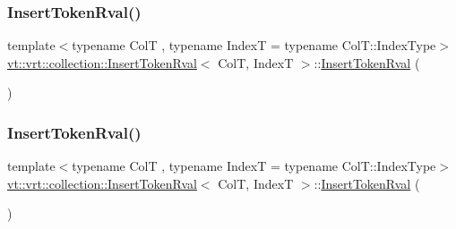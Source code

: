 \mbox{\label{structvt_1_1vrt_1_1collection_1_1_insert_token_rval_aea48b21e03ac5cab59b9e470af56f8c6}} 
\subsubsection{\texorpdfstring{Insert\+Token\+Rval()}{InsertTokenRval()}\hspace{0.1cm}{\footnotesize\ttfamily [2/3]}}
{\footnotesize\ttfamily template$<$typename ColT , typename IndexT  = typename Col\+T\+::\+Index\+Type$>$ \\
\hyperlink{structvt_1_1vrt_1_1collection_1_1_insert_token_rval}{vt\+::vrt\+::collection\+::\+Insert\+Token\+Rval}$<$ ColT, IndexT $>$\+::\hyperlink{structvt_1_1vrt_1_1collection_1_1_insert_token_rval}{Insert\+Token\+Rval} (\begin{DoxyParamCaption}\item[{\hyperlink{structvt_1_1vrt_1_1collection_1_1_insert_token_rval}{Insert\+Token\+Rval}$<$ ColT, IndexT $>$ const \&}]{ }\end{DoxyParamCaption})\hspace{0.3cm}{\ttfamily [delete]}}

\mbox{\label{structvt_1_1vrt_1_1collection_1_1_insert_token_rval_ad7bd979f47256df2d3357e2232ca23c2}} 
\subsubsection{\texorpdfstring{Insert\+Token\+Rval()}{InsertTokenRval()}\hspace{0.1cm}{\footnotesize\ttfamily [3/3]}}
{\footnotesize\ttfamily template$<$typename ColT , typename IndexT  = typename Col\+T\+::\+Index\+Type$>$ \\
\hyperlink{structvt_1_1vrt_1_1collection_1_1_insert_token_rval}{vt\+::vrt\+::collection\+::\+Insert\+Token\+Rval}$<$ ColT, IndexT $>$\+::\hyperlink{structvt_1_1vrt_1_1collection_1_1_insert_token_rval}{Insert\+Token\+Rval} (\begin{DoxyParamCaption}\item[{\hyperlink{structvt_1_1vrt_1_1collection_1_1_insert_token_rval}{Insert\+Token\+Rval}$<$ ColT, IndexT $>$ \&\&}]{ }\end{DoxyParamCaption})\hspace{0.3cm}{\ttfamily [default]}}



